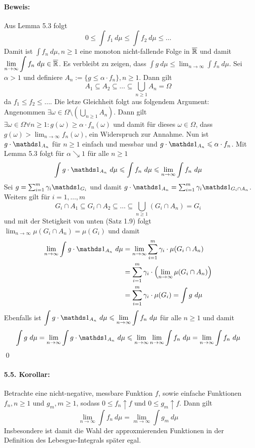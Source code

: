 \documentclass[12pt]{report}
\begin{document}
 \paragraph{Beweis:}Aus Lemma 5.3 folgt 
 $$0\leq\int f_1\ d\mu\leq\int f_2\ d\mu\leq\hdots$$
 Damit ist $\displaystyle\int f_n\ d\mu,n\geq1$ eine monoton nicht-fallende Folge in $\overline{\mathbb{R}}$ und damit $\displaystyle\lim_{n\to\infty}\int f_n\ d\mu\in\overline\R$. Es verbleibt zu zeigen, dass $\displaystyle\int g\ d\mu\leq\lim_{n\to\infty}\int f_n\ d\mu$. Sei $\alpha>1$ und definiere $A_n:=\{g\leq\alpha \cdot f_n\},n\geq1$. Dann gilt
 $$A_1\subseteq A_2\subseteq\hdots\subseteq\bigcup_{n\geq1}A_n=\Omega$$
 da $f_1\leq f_2\leq\hdots$. Die letze Gleichheit folgt aus folgendem Argument: \newline\newline
 Angenommen $\exists\omega\in\Omega\setminus\left(\bigcup_{n\geq1}A_n\right)$. Dann gilt $\exists\omega\in\Omega\forall n\geq1:g(\omega)\geq\alpha \cdot f_n(\omega)$ und damit f\"ur dieses $\omega\in\Omega$, dass $g(\omega)>\displaystyle\lim_{n\to\infty}f_n(\omega)$, ein Widerspruch zur Annahme.\newline\newline
 Nun ist $g\cdot\ind{A_n}$ f\"ur $n\geq1$ einfach und messbar und $g\cdot\ind{A_n}\leq\alpha\cdot f_n$. Mit Lemma 5.3 folgt f\"ur $\alpha\searrow1$ f\"ur alle $n\geq1$
 $$\int g\cdot\ind{A_n}\ d\mu\leq\int f_n\ d\mu\leq\lim_{n\to\infty}\int f_n\ d\mu$$
 Sei $g=\sum_{i=1}^m\gamma_i\ind{G_i}$ und damit $g\cdot\ind{A_n}=\sum_{i=1}^m\gamma_i\ind{G_i\cap A_n}$. Weiters gilt f\"ur $i=1,\hdots,m$
 $$G_i\cap A_1\subseteq G_i\cap A_2\subseteq\hdots\subseteq\bigcup_{n\geq1}(G_i\cap A_n)=G_i$$
 und mit der Stetigkeit von unten (Satz 1.9) folgt $\displaystyle\lim_{n\to\infty}\mu(G_i\cap A_n)=\mu(G_i)$ und damit
 \begin{align*}
     \lim_{n\to\infty}\int g\cdot\ind{A_n}\ d\mu&=\lim_{n\to\infty}\sum_{i=1}^m\gamma_i\cdot\mu(G_i\cap A_n)\\&=\sum_{i=1}^m\gamma_i\cdot\left(\lim_{n\to\infty}\mu(G_i\cap A_n)\right)\\&=\sum_{i=1}^m\gamma_i\cdot\mu(G_i)=\int g\ d\mu
 \end{align*}
 Ebenfalls ist $\displaystyle\int g\cdot\ind{A_n}\ d\mu\leq\lim_{n\to\infty}\int f_n\ d\mu$ f\"ur alle $n\geq1$ und damit
 $$\int g\ d\mu=\lim_{n\to\infty}\int g\cdot\ind{A_n}\ d\mu\leq\lim_{n\to\infty}\lim_{n\to\infty}\int f_n\ d\mu=\lim_{n\to\infty}\int f_n\ d\mu$$
 \qed
 
 \paragraph{5.5. Korollar:}Betrachte eine nicht-negative, messbare Funktion $f$, sowie einfache Funktionen $f_n,n\geq1$ und $g_m,m\geq1$, sodass $0\leq f_n\uparrow f\text{ und }0\leq g_m\uparrow f$. Dann gilt 
 $$\displaystyle\lim_{n\to\infty}\int f_n\ d\mu=\lim_{m\to\infty}\int g_m\ d\mu$$
 Insbesondere ist damit die Wahl der approxmierenden Funktionen in der Definition des Lebesgue-Integrals sp\"ater egal.
 
\end{document}
